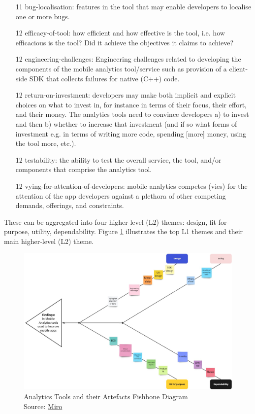 {\begin{enumerate}
    \item[11] bug-localisation: features in the tool that may enable developers to localise one or more bugs.
    \item[12] efficacy-of-tool: how efficient and how effective is the tool, i.e. how efficacious is the tool? Did it achieve the objectives it claims to achieve?
    \item[12] engineering-challenges: Engineering challenges related to developing the components of the mobile analytics tool/service such as provision of a client-side SDK that collects failures for native (C++) code.
    \item[12] return-on-investment: developers may make both implicit and explicit choices on what to invest in, for instance in terms of their focus, their effort, and their money. The analytics tools need to convince developers a) to invest and then b) whether to increase that investment (and if so what forms of investment e.g. in terms of writing more code, spending [more] money, using the tool more, etc.).
    \item[12] testability: the ability to test the overall service, the tool, and/or components that comprise the analytics tool.
    \item[12] vying-for-attention-of-developers: mobile analytics competes (vies) for the attention of the app developers against a plethora of other competing demands, offerings, and constraints. 
\end{enumerate}
}

These can be aggregated into four higher-level (L2) themes: design, fit-for-purpose, utility, dependability. Figure \ref{fig:analytics-tools-and-their-artefacts-fishbone-diagram} illustrates the top L1 themes and their main higher-level (L2) theme.

\begin{figure}
    \centering
    \includegraphics[width=\textwidth]{images/rough-sketches/analytics-tools-and-their-artefacts-fishbone-diagram-14-jun-2022a.jpeg}
    \caption{Analytics Tools and their Artefacts Fishbone Diagram\\Source: \href{https://miro.com/app/board/uXjVOtIsyWo=/?share_link_id=293061080490}{Miro}}
    \label{fig:analytics-tools-and-their-artefacts-fishbone-diagram}
\end{figure}

